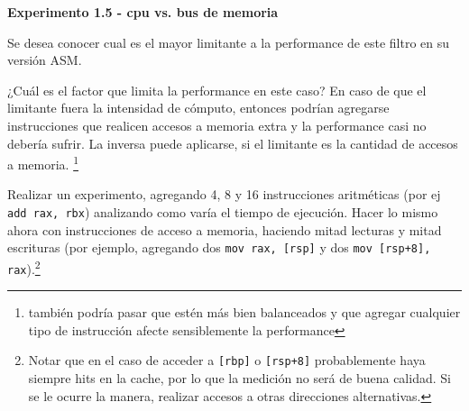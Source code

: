 \vspace*{0.3cm} \noindent
\textbf{Experimento 1.5 - cpu vs. bus de memoria}

Se desea conocer cual es el mayor limitante a la
performance de este filtro en su versión ASM.

¿Cuál es el factor que limita la performance en este caso?
En caso de que el limitante fuera la intensidad de cómputo, entonces 
podrían agregarse instrucciones que realicen accesos a memoria extra y la
performance casi no debería sufrir. 
La inversa puede aplicarse, si el limitante es la cantidad de accesos a memoria.
\footnote{también podría pasar que estén más bien balanceados y que agregar
cualquier tipo de instrucción afecte sensiblemente la performance}
	
Realizar un experimento, agregando 4, 8 y 16 instrucciones aritméticas 
(por ej \verb|add rax, rbx|) analizando como varía el tiempo de ejecución.
Hacer lo mismo ahora con instrucciones de acceso a memoria, haciendo 
mitad lecturas y mitad escrituras (por ejemplo, agregando dos 
\verb|mov rax, [rsp]| y dos \verb|mov [rsp+8], rax|).\footnote{Notar que en el caso de acceder a \texttt{[rbp]} o \texttt{[rsp+8]} probablemente haya siempre hits en la cache, por lo que la medición no será de buena calidad. Si se le ocurre la manera, realizar accesos a otras direcciones alternativas.}
	
